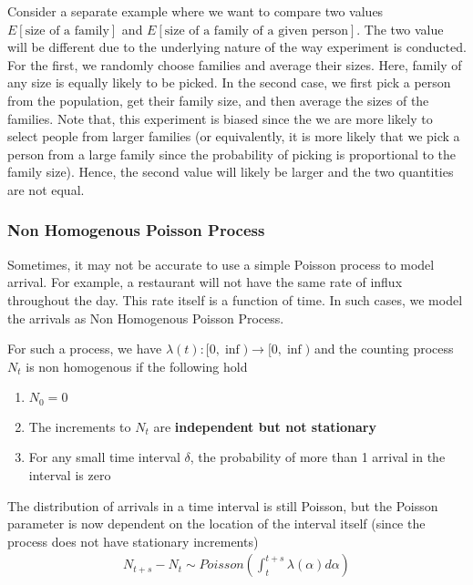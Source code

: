 \documentclass[../../probability-notes.tex]{subfiles}
\begin{document}
    Consider a separate example where we want to compare two values $E[\text{size of a family}]$ and $E[\text{size of a family of a given person}]$.\newline
    The two value will be different due to the underlying nature of the way experiment is conducted. For the first, we randomly choose families and average their sizes. Here, family of any size is equally likely to be picked. In the second case, we first pick a person from the population, get their family size, and then average the sizes of the families. Note that, this experiment is biased since the we are more likely to select people from larger families (or equivalently, it is more likely that we pick a person from a large family since the probability of picking is proportional to the family size). Hence, the second value will likely be larger and the two quantities are not equal.


    \subsubsection{Non Homogenous Poisson Process}
    Sometimes, it may not be accurate to use a simple Poisson process to model arrival. For example, a restaurant will not have the same rate of influx throughout the day. This rate itself is a function of time. In such cases, we model the arrivals as Non Homogenous Poisson Process.\newline

    For such a process, we have $\lambda(t): [0,\inf) \to [0, \inf)$ and the counting process $N_{t}$ is non homogenous if the following hold
    \begin{enumerate}
        \item $N_{0} = 0$
        \item The increments to $N_{t}$ are \textbf{independent but not stationary}
        \item For any small time interval $\delta$, the probability of more than 1 arrival in the interval is zero
    \end{enumerate}

    The distribution of arrivals in a time interval is still Poisson, but the Poisson parameter is now dependent on the location of the interval itself (since the process does not have stationary increments)
    \begin{align*}
        N_{t+s} - N_{t} \sim Poisson(\int_{t}^{t+s} \lambda(\alpha) d\alpha)
    \end{align*}
\end{document}
